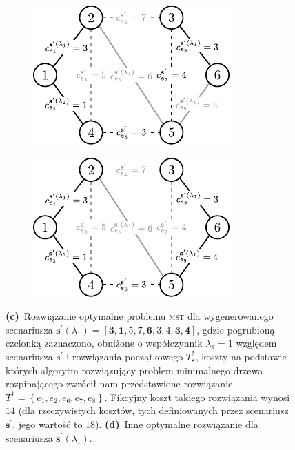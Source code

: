 \begin{figure}[!htbp]
	\ContinuedFloat
	\null\hfill
	\begin{subfigure}[b]{0.32\textwidth}
		\includegraphics[width=\textwidth]{Chapter_IV/INC-MST-example/c1}
		\caption{}
		\label{fig:imstExample:c}
	\end{subfigure}
	\hfill
	\begin{subfigure}[b]{0.32\textwidth}
		\includegraphics[width=\textwidth]{Chapter_IV/INC-MST-example/c2}
		\caption{}
		\label{fig:imstExample:d}
	\end{subfigure}
	\hfill\null
	\caption{
		\textbf{(c)}~Rozwiązanie optymalne problemu \textsc{mst} dla wygenerowanego scenariusza $\textbf{s}^{\prime} \left( \lambda_{1} \right) = \left[ \textbf{3}, \textbf{1}, 5, 7, \textbf{6}, 3, 4, \textbf{3}, \textbf{4} \right]$, gdzie pogrubioną czcionką zaznaczono, obniżone o współczynnik $\lambda_{1} = 1$ względem scenariusza $s^{\prime}$ i rozwiązania początkowego $T^{\ast}_{\textbf{s}}$, koszty na podstawie których algorytm rozwiązujący problem minimalnego drzewa rozpinającego zwrócił nam przedstawione rozwiązanie $T^{1} = \left\{ e_{1}, e_{2}, e_{6}, e_{7}, e_{8} \right\}$. Fikcyjny koszt takiego rozwiązania wynosi $14$ (dla rzeczywistych kosztów, tych definiowanych przez scenariusz $\textbf{s}^{\prime}$, jego wartość to $18$).
		\textbf{(d)}~Inne optymalne rozwiązanie dla scenariusza $\textbf{s}^{\prime} \left( \lambda_{1} \right)$.
	}
\end{figure}

